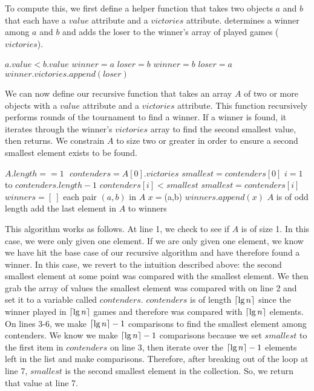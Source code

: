 \documentclass[11pt]{article}
\DeclarePairedDelimiter{\ceil}{\lceil}{\rceil}
\begin{document}
To compute this, we first define a helper function  that takes two objects $a$ and $b$ that each have a $value$ attribute and a $victories$ attribute.  determines a winner among $a$ and $b$ and adds the loser to the winner's array of played games ($victories$).

\begin{codebox}
\li \If $a.value < b.value$ \Do
\li     $winner = a$
\li     $loser = b$
    \End
\li \Else \Do
\li     $winner = b$
\li     $loser = a$
\li \End
\li $winner.victories.append(loser)$
\li {}
\end{codebox}

We can now define our recursive function  that takes an array $A$ of two or more objects with a $value$ attribute and a $victories$ attribute. This function recursively performs rounds of the tournament to find a winner. If a winner is found, it iterates through the winner's $victories$ array to find the second smallest value, then returns. We constrain $A$ to size two or greater in order to ensure a second smallest element exists to be found.

\begin{codebox}
\li \If $A.length == 1$ $    $  \Do
\li     $contenders = A[0].victories$
\li     $smallest = contenders[0]$
\li     \For $i=1$ to $contenders.length - 1$ \Do
\li         \If $contenders[i] < smallest$ \Do
\li             $smallest = contenders[i]$
            \End
        \End
\li     {}
\li \End
\li \Else \Do
\li     $winners = [~]$
\li     \For each pair $(a,b)$ in $A$ \Do
\li         $x = $(a,b)
\li         $winners.append(x)$
        \End
\li     \If $A$ is of odd length \Do
\li         add the last element in $A$ to winners
        \End
\li     {}
    \End
\end{codebox}

This algorithm works as follows. At line 1, we check to see if $A$ is of size 1. In this case, we were only given one element. If we are only given one element, we know we have hit the base case of our recursive algorithm and have therefore found a winner. In this case, we revert to the intuition described above: the second smallest element at some point was compared with the smallest element. We then grab the array of values the smallest element was compared with on line 2 and set it to a variable called $contenders$. $contenders$ is of length $\ceil{\lg{n}}$ since the winner played in $\ceil{\lg{n}}$ games and therefore was compared with $\ceil{\lg{n}}$ elements. On lines 3-6, we make $\ceil{\lg{n}} - 1$ comparisons to find the smallest element among contenders. We know we make $\ceil{\lg{n}} - 1$ comparisons because we set $smallest$ to the first item in $contenders$ on line 3, then iterate over the $\ceil{\lg{n}} - 1$ elements left in the list and make comparisons. Therefore, after breaking out of the loop at line 7, $smallest$ is the second smallest element in the collection. So, we return that value at line 7.
\end{document}
